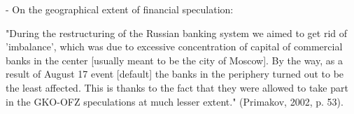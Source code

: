 - On the geographical extent of financial speculation:

"During the restructuring of the Russian banking system we aimed to get rid of 'imbalance', which was due to excessive concentration of capital of commercial banks in the center [usually meant to be the city of Moscow]. By the way, as a result of August 17 event [default] the banks in the periphery turned out to be the least affected. This is thanks to the fact that they were allowed to take part in the GKO-OFZ speculations at much lesser extent." (Primakov, 2002, p. 53).

